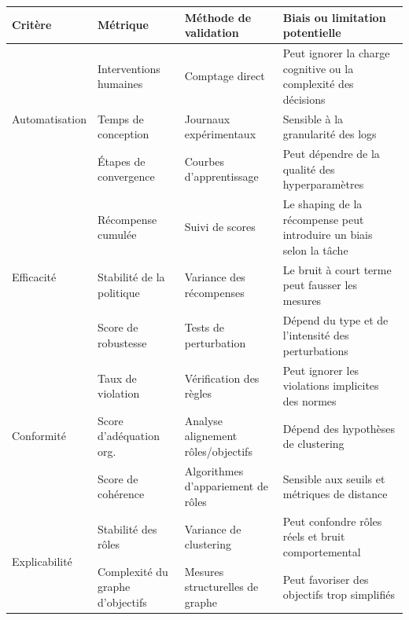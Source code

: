 \documentclass[pdflatex,sn-mathphys-num]{sn-jnl}%
\theoremstyle{thmstyleone}%
\theoremstyle{thmstyletwo}%
\theoremstyle{thmstylethree}%
\begin{document}
\begin{table}[h!]
    \centering
    \renewcommand{\arraystretch}{1.3}
    \begin{footnotesize}
        \begin{tabular}{p{1.5cm}p{2.4cm}p{2.2cm}p{4.5cm}}
            \hline
            \textbf{Critère} & \textbf{Métrique}       & \textbf{Méthode de validation}   & \textbf{Biais ou limitation potentielle}            \\
            \hline
            \multirow{3}{*}{Automatisation}
                               & Interventions humaines   & Comptage direct              & Peut ignorer la charge cognitive ou la complexité des décisions \\
                               & Temps de conception      & Journaux expérimentaux       & Sensible à la granularité des logs                \\
                               & Étapes de convergence    & Courbes d'apprentissage      & Peut dépendre de la qualité des hyperparamètres   \\
            \hline
            \multirow{3}{*}{Efficacité}
                               & Récompense cumulée       & Suivi de scores              & Le shaping de la récompense peut introduire un biais selon la tâche \\
                               & Stabilité de la politique & Variance des récompenses     & Le bruit à court terme peut fausser les mesures  \\
                               & Score de robustesse      & Tests de perturbation        & Dépend du type et de l'intensité des perturbations \\
            \hline
            \multirow{3}{*}{Conformité}
                               & Taux de violation        & Vérification des règles      & Peut ignorer les violations implicites des normes \\
                               & Score d'adéquation org.  & Analyse alignement rôles/objectifs & Dépend des hypothèses de clustering \\
                               & Score de cohérence       & Algorithmes d'appariement de rôles & Sensible aux seuils et métriques de distance \\
            \hline
            \multirow{3}{*}{Explicabilité}
                               & Stabilité des rôles      & Variance de clustering       & Peut confondre rôles réels et bruit comportemental \\
                               & Complexité du graphe d'objectifs & Mesures structurelles de graphe & Peut favoriser des objectifs trop simplifiés \\

\end{tabular}
\end{footnotesize}
\end{table}
\end{document}
